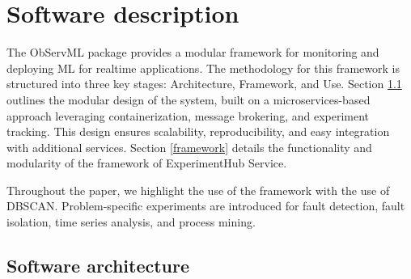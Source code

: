 \documentclass[preprint,12pt, a4paper]{elsarticle}
\begin{document}


\section{Software description}


The ObServML package provides a modular framework for monitoring and deploying ML for realtime applications. The methodology for this framework is structured into three key stages: Architecture, Framework, and Use. Section \ref{architecture} outlines the modular design of the system, built on a microservices-based approach leveraging containerization, message brokering, and experiment tracking. This design ensures scalability, reproducibility, and easy integration with additional services. Section \ref{framework} details the functionality and modularity of the framework of ExperimentHub Service.

Throughout the paper, we highlight the use of the framework with the use of DBSCAN. Problem-specific experiments are introduced for fault detection, fault isolation, time series analysis, and process mining. 

\subsection{Software architecture} \label{architecture}
\end{document}
